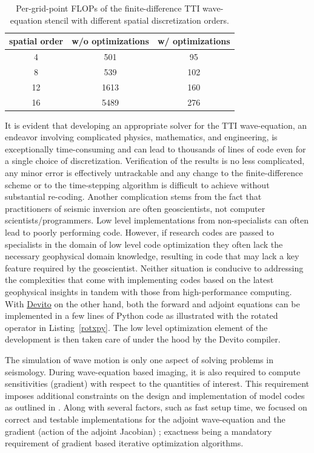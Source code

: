 \documentclass[10pt, conference]{IEEEtran}
\newcommand{\devito}{\href{https://github.com/devitocodes/devito}{Devito} }
\begin{document}
\begin{table}
\centering
\begin{tabular}{ccc}
\toprule\addlinespace
spatial order & w/o optimizations & w/ optimizations\tabularnewline
\midrule
4 & 501 & 95\tabularnewline
8 & 539 & 102\tabularnewline
12 & 1613 & 160\tabularnewline
16 & 5489 & 276\tabularnewline
\bottomrule
\end{tabular}
\caption{Per-grid-point FLOPs of the finite-difference TTI wave-equation stencil
with different spatial discretization orders.}\label{ttiFLOPs}
\end{table}

It is evident that developing an appropriate solver for the TTI wave-equation,
an endeavor involving complicated physics, mathematics, and engineering, is
exceptionally time-consuming and can lead to thousands of lines of code even for
a single choice of discretization. Verification of the results is no less
complicated, any minor error is effectively untrackable and any change to the
finite-difference scheme or to the time-stepping algorithm is difficult to
achieve without substantial re-coding. Another complication stems from the fact
that practitioners of seismic inversion are often geoscientists, not computer
scientists/programmers. Low level implementations from non-specialists can
often lead to poorly performing code. However, if research codes are passed to
specialists in the domain of low level code optimization they often lack the
necessary geophysical domain knowledge, resulting in code that may lack a key
feature required by the geoscientist. Neither situation is conducive to
addressing the complexities that come with implementing codes based on the
latest geophysical insights in tandem with those from high-performance
computing. With \devito on the other hand, both the forward and adjoint
equations can be implemented in a few lines of Python code as illustrated
with the rotated operator in Listing~\ref{rotxpy}. The low level optimization element
of the development is then taken care of under the hood by the Devito
compiler.

The simulation of wave motion is only one aspect of solving problems in
seismology. During wave-equation based imaging, it is also required to compute
sensitivities (gradient) with respect to the quantities of interest. This
requirement imposes additional constraints on the design and implementation of
model codes as outlined in \cite{virieux}. Along with several factors, such as
fast setup time, we focused on correct and testable implementations for the
adjoint wave-equation and the gradient (action of the adjoint Jacobian)
\cite{louboutin2018segeow, louboutin2020THmfi}; exactness being a mandatory
requirement of gradient based iterative optimization algorithms.
\end{document}
